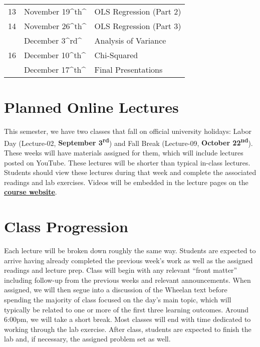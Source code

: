 \documentclass[]{book}
\theoremstyle{definition}
\theoremstyle{definition}
\theoremstyle{definition}
\theoremstyle{remark}
\begin{document}
\begin{table}
\begin{tabular}[t]{lll}
13 & November 19\textasciicircum{}th\textasciicircum{} & OLS Regression (Part 2)\\
14 & November 26\textasciicircum{}th\textasciicircum{} & OLS Regression (Part 3)\\
\addlinespace
15 & December 3\textasciicircum{}rd\textasciicircum{} & Analysis of Variance\\
16 & December 10\textasciicircum{}th\textasciicircum{} & Chi-Squared\\
 & December 17\textasciicircum{}th\textasciicircum{} & Final Presentations\\
\bottomrule
\end{tabular}
\end{table}

\hypertarget{planned-online-lectures}{%
\section{Planned Online Lectures}\label{planned-online-lectures}}

This semester, we have two classes that fall on official university
holidays: Labor Day (Lecture-02, \textbf{September
3\textsuperscript{rd}}) and Fall Break (Lecture-09, \textbf{October
22\textsuperscript{nd}}). These weeks will have materials assigned for
them, which will include lectures posted on YouTube. These lectures will
be shorter than typical in-class lectures. Students should view these
lectures during that week and complete the associated readings and lab
exercises. Videos will be embedded in the lecture pages on the
\href{https://slu-soc5050.github.io/}{\textbf{course website}}.

\hypertarget{class-progression}{%
\section{Class Progression}\label{class-progression}}

Each lecture will be broken down roughly the same way. Students are
expected to arrive having already completed the previous week's work as
well as the assigned readings and lecture prep. Class will begin with
any relevant ``front matter'' including follow-up from the previous
weeks and relevant announcements. When assigned, we will then segue into
a discussion of the Wheelan text before spending the majority of class
focused on the day's main topic, which will typically be related to one
or more of the first three learning outcomes. Around 6:00pm, we will
take a short break. Most classes will end with time dedicated to working
through the lab exercise. After class, students are expected to finish
the lab and, if necessary, the assigned problem set as well.
\end{document}
